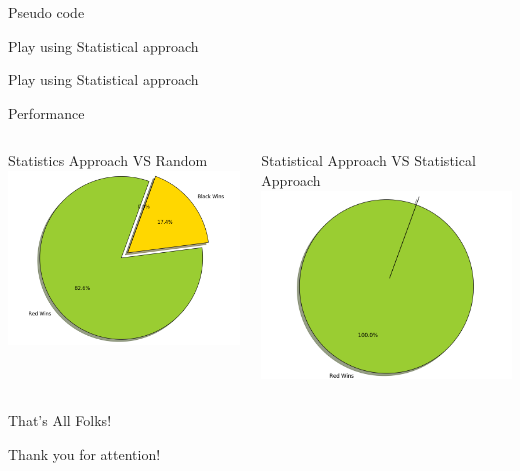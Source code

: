 \documentclass{beamer}
\begin{document}
\begin{frame}{Pseudo code}
	\begin{block}{Play using Statistical approach}
		\Statistical
	\end{block}
	
	\begin{block}{Play using Statistical approach}
		\StatisticalPlay
	\end{block}
\end{frame}
\begin{frame}{Performance}
	    \begin{columns}
	 	\begin{column}{0.5\textwidth}
	 	Statistics Approach VS Random
			\centering
			\includegraphics[scale = .30]{statVsrand.png}
	 	\end{column}
 		\begin{column}{0.5\textwidth}
 		Statistical Approach VS Statistical Approach
			\centering
			\includegraphics[scale = 0.30]{statVsstat.png}	
	 	\end{column}
	 \end{columns}
\end{frame}



\begin{frame}{That's All Folks!}
	\begin{center}
     {\huge	Thank you for attention! }
	\end{center}
	
\end{frame}
\end{document}
